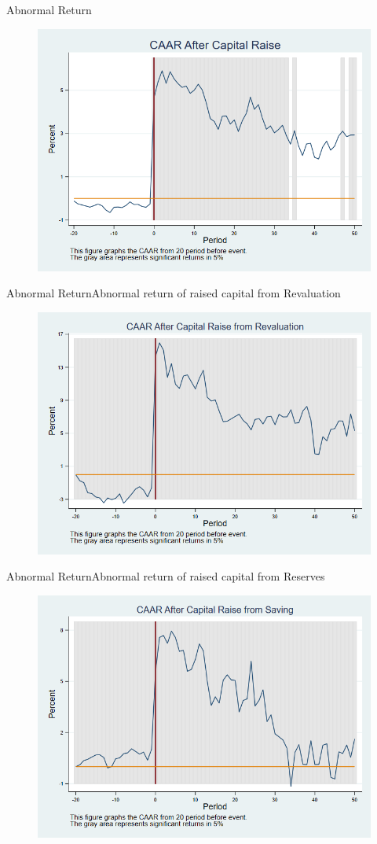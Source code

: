 \documentclass{beamer}
\begin{document}
	\begin{frame}{Abnormal Return}
		\label{car_industry}
		\begin{figure}
			\centering
			\includegraphics[width=0.7\linewidth]{Output/car_industry.png}
			\label{fig:car_industry}
		\end{figure}
	\end{frame}
	
	\begin{frame}{Abnormal Return}{Abnormal return of raised capital from Revaluation}
		\label{car_industryRevaluation}
		\begin{figure}
			\centering
			\includegraphics[width=0.65\linewidth]{Output/car_industryRevaluation.png}
			\label{fig:car_industryRevaluation}
		\end{figure}
	\end{frame}
	
	
	\begin{frame}{Abnormal Return}{Abnormal return of raised capital from Reserves}
		\label{car_industrySaving}
		\begin{figure}
			\centering
			\includegraphics[width=0.65\linewidth]{Output/car_industrySaving.png}
			\label{fig:car_industrySaving}
		\end{figure}
	\end{frame}
	
\end{document}

